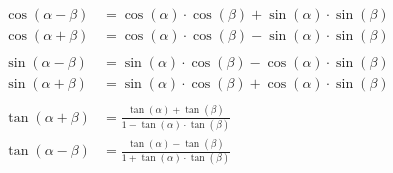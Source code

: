 \begin{equation}
\begin{split}

    \cos(\alpha - \beta) &= \cos(\alpha) \cdot \cos(\beta) + \sin(\alpha) \cdot \sin(\beta) \\
    \cos(\alpha + \beta) &= \cos(\alpha) \cdot \cos(\beta) - \sin(\alpha) \cdot \sin(\beta) \\

    &\\

    \sin(\alpha - \beta) &= \sin(\alpha) \cdot \cos(\beta) - \cos(\alpha) \cdot \sin(\beta) \\
    \sin(\alpha + \beta) &= \sin(\alpha) \cdot \cos(\beta) + \cos(\alpha) \cdot \sin(\beta) \\

    &\\

    \tan(\alpha + \beta) &= \frac{\tan(\alpha) + \tan(\beta)}{1 - \tan(\alpha) \cdot \tan(\beta)} \\
    \tan(\alpha - \beta) &= \frac{\tan(\alpha) - \tan(\beta)}{1 + \tan(\alpha) \cdot \tan(\beta)}
\end{split}
\end{equation}